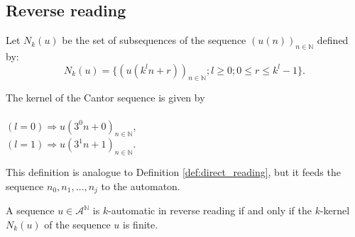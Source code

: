 \documentclass{article}
\begin{document}
\subsection{Reverse reading}
\begin{definition}[$k$-kernel] \label{def:k-kernel}
Let $N_k(u)$ be the set of subsequences of the sequence 
$(u(n))_{n \in \mathbb{N}}$ defined by:
\begin{displaymath}
N_k(u) = \{(u(k^ln + r))_{n \in \mathbb{N}}; l \ge 0; 0 \le r \le k^l - 1\}.
\end{displaymath}
\end{definition}

\begin{example} \label{ex:k-kernel}
The kernel of the Cantor sequence is given by\\
\\
$(l = 0) \Rightarrow u(3^0 n + 0)_{n \in \mathbb{N}}$,\\
$(l = 1) \Rightarrow u(3^1 n + 1)_{n \in \mathbb{N}}$.\\
\end{example}

\begin{definition} \label{def:reverse_reading}
This definition is analogue to Definition \ref{def:direct_reading}, but it
feeds the sequence $n_0, n_1, \ldots, n_j$ to the automaton.
\end{definition}

\begin{theorem} \label{thm:reverse_reading}
A sequence $u \in \mathcal{A}^\mathbb{N}$ is $k$-automatic in reverse reading 
if and only if the $k$-kernel $N_k(u)$ of the sequence $u$ is finite.
\end{theorem}
\end{document}
